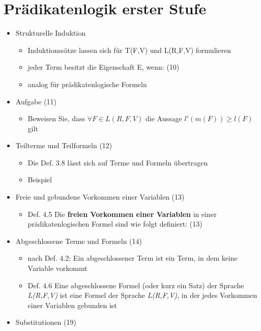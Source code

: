 \section{Prädikatenlogik erster Stufe}
\begin{itemize}
	\item Strukturelle Induktion
	\begin{itemize}
		\item Induktionssätze lassen sich für T(F,V) und L(R,F,V) 						formulieren
		\item jeder Term besitzt die Eigenschaft E, wenn: (10)
		\item analog für prädikatenlogische Formeln
	\end{itemize}
	\item Aufgabe (11)
	\begin{itemize}
		\item Beweisen Sie, dass \begin{math}\forall F \in L(R,F,V) 			\end{math} die Aussage \begin{math} l'(m(F))\ge l(F) \end{math} gilt 
	\end{itemize}
	\item Teilterme und Teilformeln (12)
	\begin{itemize}
		\item Die Def. 3.8 lässt sich auf Terme und Formeln übertragen
		\item Beispiel
	\end{itemize}
	\item Freie und gebundene Vorkommen einer Variablen (13)
	\begin{itemize}
		\item Def. 4.5 Die \textbf{freien Vorkommen einer Variablen} in 				einer prädikatenlogischen Formel sind wie folgt definiert: 					(13)
	\end{itemize}
	\item Abgeschlossene Terme und Formeln (14)
	\begin{itemize}
		\item nach Def. 4.2: Ein abgeschlossener Term ist ein Term, in 						dem	keine Variable vorkommt
		\item Def. 4.6 Eine abgeschlossene Formel (oder kurz 							ein Satz) der Sprache  \textit{L(R,F,V)} ist eine Formel der 			Sprache \textit{L(R,F,V)}, in der jedes Vorkommen einer 					Variablen gebunden ist
	\end{itemize}
	\item Substitutionen (19)

\end{itemize}
